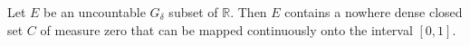 Let $E$ be an uncountable $G_{\delta}$ subset of $\mathbb{R}$. Then $E$ contains a nowhere dense closed set $C$ of measure zero that can be mapped continuously onto the interval $[0, 1]$.